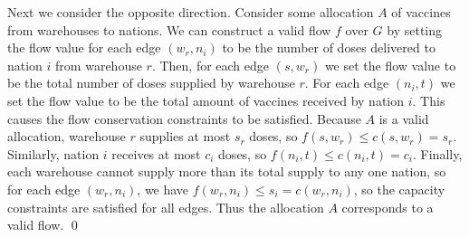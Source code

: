 \documentclass[11pt]{exam}
\begin{document}
Next we consider the opposite direction. Consider some allocation $ A
$ of vaccines from warehouses to nations. We can construct a valid
flow $ f $ over $ G $ by setting the flow value for each edge $ (w_r,
n_i) $ to be the number of doses delivered to nation $ i $ from
warehouse $ r $. Then, for each edge $ (s, w_r) $ we set the flow
value to be the total number of doses supplied by warehouse $ r $.
For each edge $ (n_i, t) $ we set the flow value to be the total
amount of vaccines received by nation $ i $. This causes the flow
conservation constraints to be satisfied. Because $ A $ is a valid
allocation, warehouse $ r $ supplies at most $ s_r $ doses, so $ f(s,
w_r) \leq c(s, w_r) = s_r $. Similarly, nation $ i $ receives at most
$ c_i $ doses, so $ f(n_i, t) \leq c(n_i, t) = c_i $. Finally, each
warehouse cannot supply more than its total supply to any one nation,
so for each edge $ (w_r, n_i) $, we have $ f(w_r, n_i) \leq s_i =
c(w_r, n_i) $, so the capacity constraints are satisfied for all
edges. Thus the allocation $ A $ corresponds to a valid flow. \hfill \qed

\end{document}
